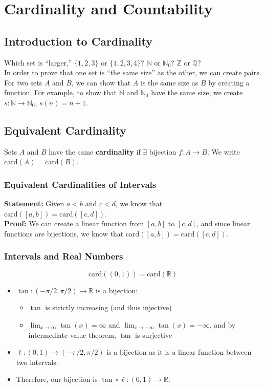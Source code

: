 \documentclass[10pt]{extarticle}
\begin{document}
  \section{Cardinality and Countability}%
  \subsection{Introduction to Cardinality}%
    Which set is ``larger,'' $\{1,2,3\}$ or $\{1,2,3,4\}$? $\mathbb{N}$ or $\mathbb{N}_0$? $\mathbb{Z}$ or $\mathbb{Q}$?\\

    In order to prove that one set is ``the same size'' as the other, we can create pairs. For two sets $A$ and $B$, we can show that $A$ is the same size as $B$ by creating a function. For example, to show that $\mathbb{N}$ and $\mathbb{N}_0$ have the same size, we create $s:\mathbb{N} \rightarrow \mathbb{N}_0$, $s(n) = n+1$.
  \subsection{Equivalent Cardinality}%
      Sets $A$ and $B$ have the same \textbf{cardinality} if $\exists$ bijection $f:A\rightarrow B$. We write $\text{card}(A) = \text{card}(B)$.
      \subsubsection{Equivalent Cardinalities of Intervals}%
      \textbf{Statement:} Given $a<b$ and $c<d$, we know that $\text{card}\left([a,b]\right) = \text{card}\left([c,d]\right)$.\\

      \textbf{Proof:} We can create a linear function from $[a,b]$ to $[c,d]$, and since linear functions are bijections, we know that $\text{card}\left([a,b]\right) = \text{card}\left([c,d]\right)$.\\
      \subsubsection{Intervals and Real Numbers}%
      \[
        \text{card}\left((0,1)\right) = \text{card}(\mathbb{R})
      \] 
      \begin{itemize}
        \item $\tan: (-\pi/2,\pi/2) \rightarrow \mathbb{R}$ is a bijection:
          \begin{itemize}
            \item $\tan$ is strictly increasing (and thus injective)
            \item $\lim_{x\rightarrow\infty} \tan(x) = \infty$ and $\lim_{x\rightarrow -\infty}\tan(x) = -\infty$, and by intermediate value theorem, $\tan$ is surjective
          \end{itemize}
        \item $\ell: (0,1) \rightarrow (-\pi/2,\pi/2)$ is a bijection as it is a linear function between two intervals.
        \item Therefore, our bijection is $\tan \circ \ell: (0,1) \rightarrow \mathbb{R}$.
      \end{itemize}
\end{document}
